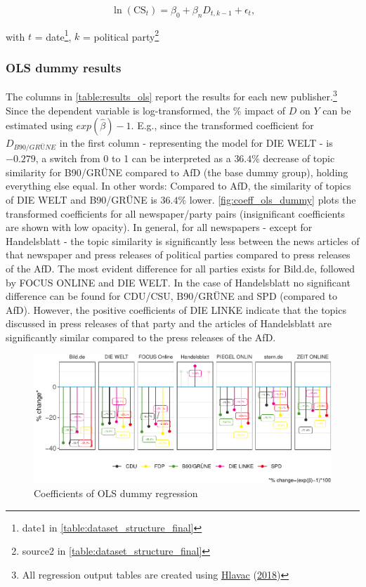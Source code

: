 \documentclass[
  12pt,
]{article}
\begin{document}
\[
\ln(\text{CS}_{t})=\beta_0+\beta_nD_{t,k-1}+\epsilon_t\text{,}
\]

with \(t\) = date\footnote{date1 in
  \autoref{table:dataset_structure_final}}, \(k\) = political
party\footnote{source2 in \autoref{table:dataset_structure_final}}

\hypertarget{ols-dummy-results}{%
\subsubsection{OLS dummy results}\label{ols-dummy-results}}

The columns in \autoref{table:results_ols} report the results for each
new publisher.\footnote{All regression output tables are created using
  \protect\hyperlink{ref-hlavac_stargazer_2018}{Hlavac}
  (\protect\hyperlink{ref-hlavac_stargazer_2018}{2018})} Since the
dependent variable is log-transformed, the \(\%\) impact of \(D\) on
\(Y\) can be estimated using \(exp(\hat\beta)-1\). E.g., since the
transformed coefficient for \(D_{B90/GRÜNE}\) in the first column -
representing the model for DIE WELT - is \(-0.279\), a switch from 0 to
1 can be interpreted as a \(36.4\%\) decrease of topic similarity for
B90/GRÜNE compared to AfD (the base dummy group), holding everything
else equal. In other words: Compared to AfD, the similarity of topics of
DIE WELT and B90/GRÜNE is \(36.4\%\) lower.
\autoref{fig:coeff_ols_dummy} plots the transformed coefficients for all
newspaper/party pairs (insignificant coefficients are shown with low
opacity). In general, for all newspapers - except for Handelsblatt - the
topic similarity is significantly less between the news articles of that
newspaper and press releases of political parties compared to press
releases of the AfD. The most evident difference for all parties exists
for Bild.de, followed by FOCUS ONLINE and DIE WELT. In the case of
Handelsblatt no significant difference can be found for CDU/CSU,
B90/GRÜNE and SPD (compared to AfD). However, the positive coefficients
of DIE LINKE indicate that the topics discussed in press releases of
that party and the articles of Handelsblatt are significantly similar
compared to the press releases of the AfD.

\begin{figure}

{\centering \includegraphics[width=1\linewidth]{main_text_files/figure-latex/Plot coefficients - simple dummy-1} 

}

\caption{Coefficients of OLS dummy regression \label{fig:coeff_ols_dummy}}\label{fig:Plot coefficients - simple dummy}
\end{figure}
\end{document}
